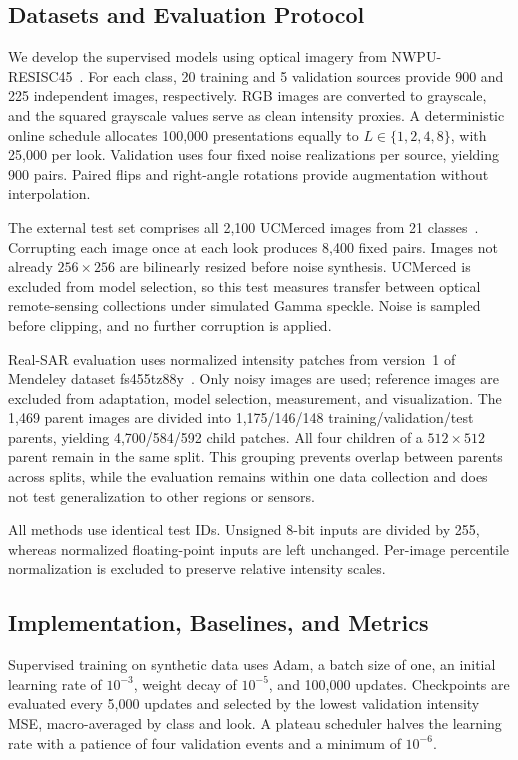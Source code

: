 \documentclass[conference]{IEEEtran}
\begin{document}
\subsection{Datasets and Evaluation Protocol}
We develop the supervised models using optical imagery from NWPU-RESISC45~\cite{cheng2017}. For each class, 20 training and 5 validation sources provide 900 and 225 independent images, respectively. RGB images are converted to grayscale, and the squared grayscale values serve as clean intensity proxies. A deterministic online schedule allocates 100,000 presentations equally to \(L\in\{1,2,4,8\}\), with 25,000 per look. Validation uses four fixed noise realizations per source, yielding 900 pairs. Paired flips and right-angle rotations provide augmentation without interpolation.

The external test set comprises all 2,100 UCMerced images from 21 classes~\cite{yang2010}. Corrupting each image once at each look produces 8,400 fixed pairs. Images not already \(256\times256\) are bilinearly resized before noise synthesis. UCMerced is excluded from model selection, so this test measures transfer between optical remote-sensing collections under simulated Gamma speckle. Noise is sampled before clipping, and no further corruption is applied.

Real-SAR evaluation uses normalized intensity patches from version~1 of Mendeley dataset fs455tz88y~\cite{vasquez2024data}. Only noisy images are used; reference images are excluded from adaptation, model selection, measurement, and visualization. The 1,469 parent images are divided into 1,175/146/148 training/validation/test parents, yielding 4,700/584/592 child patches. All four children of a \(512\times512\) parent remain in the same split. This grouping prevents overlap between parents across splits, while the evaluation remains within one data collection and does not test generalization to other regions or sensors.

All methods use identical test IDs. Unsigned 8-bit inputs are divided by 255, whereas normalized floating-point inputs are left unchanged. Per-image percentile normalization is excluded to preserve relative intensity scales.

\subsection{Implementation, Baselines, and Metrics}
Supervised training on synthetic data uses Adam, a batch size of one, an initial learning rate of \(10^{-3}\), weight decay of \(10^{-5}\), and 100,000 updates. Checkpoints are evaluated every 5,000 updates and selected by the lowest validation intensity MSE, macro-averaged by class and look. A plateau scheduler halves the learning rate with a patience of four validation events and a minimum of \(10^{-6}\).
\end{document}
